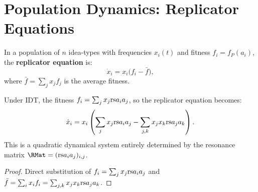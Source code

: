 \begin{center}
\end{center}

\section{Population Dynamics: Replicator Equations}

\begin{definition}
\label{def:replicator}
In a population of $n$ idea-types with frequencies $x_i(t)$ and
fitness $f_i = f_P(a_i)$, the \textbf{replicator equation} is:
\[
  \dot{x}_i = x_i \bigl(f_i - \bar{f}\bigr),
\]
where $\bar{f} = \sum_{j} x_j f_j$ is the average fitness.
\end{definition}

\begin{theorem}
\label{thm:replicator-resonance}
Under IDT, the fitness $f_i = \sum_j x_j \mathrm{rs}{a_i}{a_j}$, so the
replicator equation becomes:
\[
  \dot{x}_i = x_i \left(\sum_j x_j \mathrm{rs}{a_i}{a_j} - \sum_{j,k} x_j x_k
  \mathrm{rs}{a_j}{a_k}\right).
\]
This is a quadratic dynamical system entirely determined by the resonance
matrix $\RMat = (\rs{a_i}{a_j})_{i,j}$.
\end{theorem}

\begin{proof}
Direct substitution of $f_i = \sum_j x_j \mathrm{rs}{a_i}{a_j}$ and $\bar{f} =
\sum_i x_i f_i = \sum_{j,k} x_j x_k \mathrm{rs}{a_j}{a_k}$.
\end{proof}

